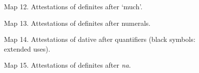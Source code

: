 \begin{figure}[h]

\begin{minipage}{4.19653in}

\label{bkm:Ref224379723}Map 12. Attestations of definites after ‘much’.


\end{minipage}

\end{figure}



\begin{figure}[h]

\begin{minipage}{4.15in}

Map 13. Attestations of definites after numerals.


\end{minipage}

\end{figure}



\begin{figure}[h]

\begin{minipage}{4.98333in}

Map 14. Attestations of dative after quantifiers (black symbols: extended uses).


\end{minipage}

\end{figure}

\begin{figure}[h]

\begin{minipage}{4.75in}

Map 15. Attestations of definites after \textit{na}.


\end{minipage}

\end{figure}

